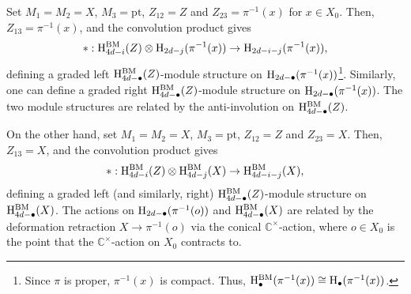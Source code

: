Set $M_1 = M_2 = X$, $M_3 = \mathrm{pt}$, $Z_{12} = Z$ and $Z_{23} = \pi^{-1}(x)$ for $x \in X_0$. Then, $Z_{13} = \pi^{-1}(x)$, and the convolution product gives
\begin{equation*}
    {*} : \mathrm{H}^\mathrm{BM}_{4d-i}(Z) \otimes \mathrm{H}_{2d-j}(\pi^{-1}(x)) \to \mathrm{H}_{2d-i-j}(\pi^{-1}(x)),
\end{equation*}
defining a graded left $\mathrm{H}^\mathrm{BM}_{4d-\bullet}(Z)$-module structure on $\mathrm{H}_{2d-\bullet}(\pi^{-1}(x))$\footnote{Since $\pi$ is proper, $\pi^{-1}(x)$ is compact. Thus, $\mathrm{H}^\mathrm{BM}_\bullet(\pi^{-1}(x)) \cong \mathrm{H}_\bullet(\pi^{-1}(x))$.}. Similarly, one can define a graded right $\mathrm{H}^\mathrm{BM}_{4d-\bullet}(Z)$-module structure on $\mathrm{H}_{2d-\bullet}(\pi^{-1}(x))$. The two module structures are related by the anti-involution on $\mathrm{H}^\mathrm{BM}_{4d-\bullet}(Z)$.

On the other hand, set $M_1 = M_2 = X$, $M_3 = \mathrm{pt}$, $Z_{12} = Z$ and $Z_{23} = X$. Then, $Z_{13} = X$, and the convolution product gives
\begin{equation*}
    {*} : \mathrm{H}^\mathrm{BM}_{4d-i}(Z) \otimes \mathrm{H}^\mathrm{BM}_{4d-j}(X) \to \mathrm{H}^\mathrm{BM}_{4d-i-j}(X),
\end{equation*}
defining a graded left (and similarly, right) $\mathrm{H}^\mathrm{BM}_{4d-\bullet}(Z)$-module structure on $\mathrm{H}^\mathrm{BM}_{4d-\bullet}(X)$. The actions on $\mathrm{H}_{2d-\bullet}(\pi^{-1}(o))$ and $\mathrm{H}^\mathrm{BM}_{4d-\bullet}(X)$ are related by the deformation retraction $X \to \pi^{-1}(o)$ via the conical $\mathbb{C}^\times$-action, where $o \in X_0$ is the point that the $\mathbb{C}^\times$-action on $X_0$ contracts to.

